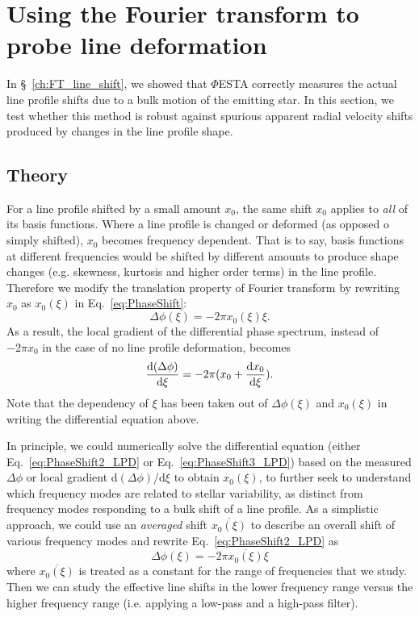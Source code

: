 \section{Using the Fourier transform to probe line deformation}
\label{\thesection}
\label{sec:FT_ld}

In \S~\ref{ch:FT_line_shift}, we showed that $\mathit{\Phi}$ESTA correctly measures the actual line profile shifts due to a bulk motion of the emitting star. In this section, we test whether this method is robust against spurious apparent radial velocity shifts produced by changes in the line profile shape.


\subsection{Theory}
\label{sec:LD_Theory}

For a line profile shifted by a small amount $x_0$, the same shift $x_0$ applies to \textit{all} of its basis functions. Where a line profile is changed or deformed (as opposed o simply shifted), $x_0$ becomes frequency dependent. That is to say, basis functions at different frequencies would be shifted by different amounts to produce shape changes (e.g. skewness, kurtosis and higher order terms) in the line profile. Therefore we modify the translation property of Fourier transform by rewriting $x_0$ as $x_0(\xi)$ in Eq.~\ref{eq:PhaseShift}:
\begin{equation}
	\Delta \phi(\xi) = -2 \pi x_0(\xi) \xi.
\label{eq:PhaseShift2_LPD}
\end{equation}
As a result, the local gradient of the differential phase spectrum, instead of $-2 \pi x_0$ in the case of no line profile deformation, becomes 
\begin{equation}
	\dv{(\Delta \phi)}{\xi} = -2 \pi (x_0 + \dv{x_0}{\xi}).
\label{eq:PhaseShift3_LPD}
\end{equation}
Note that the dependency of $\xi$ has been taken out of $\Delta \phi(\xi)$ and 
$x_0(\xi)$ in writing the differential equation above. 

In principle, we could numerically solve the differential equation (either Eq.~\ref{eq:PhaseShift2_LPD} or Eq.~\ref{eq:PhaseShift3_LPD}) based on the measured $\Delta \phi$ or local gradient d$(\Delta \phi)$/d$\xi$ to obtain $x_0(\xi)$, to further seek to understand which frequency modes are related to stellar variability, as distinct from frequency modes responding to a bulk shift of a line profile. As a simplistic approach, we could use an \textit{averaged} shift $\overline{x_0(\xi)}$ to describe an overall shift of various frequency modes and rewrite Eq.~\ref{eq:PhaseShift2_LPD} as 
\begin{equation}
	\Delta \phi(\xi) = -2 \pi \overline{x_0(\xi)} \xi
\end{equation}
where $\overline{x_0(\xi)}$ is treated as a constant for the range of frequencies that we study. Then we can study the effective line shifts in the lower frequency range versus the higher frequency range (i.e. applying a low-pass and a high-pass filter). 

